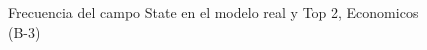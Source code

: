 \begin{figure}[H]
    \centering
    
    \caption{Frecuencia del campo State en el modelo real y Top 2, Economicos (B-3)}
    \label{frecuency-State-top2}
\end{figure}